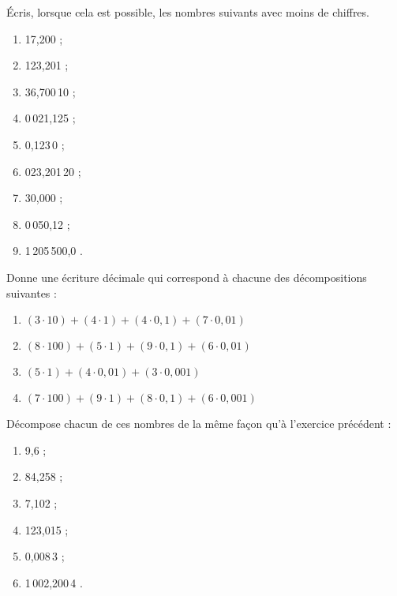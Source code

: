 \begin{exercice}
Écris, lorsque cela est possible, les nombres suivants avec moins de chiffres.
\begin{enumerate} 
 \item 17,200 \dotfill ; 
 
 \item 123,201 \dotfill ; 
  
 \item 36,700\,10 \dotfill ; 
 
 \item 0\,021,125 \dotfill ; 
 
 \item 0,123\,0 \dotfill ; 
 
 \item 023,201\,20 \dotfill ; 
 
 \item 30,000 \dotfill ; 
 
 \item 0\,050,12 \dotfill ; 
 
 \item 1\,205\,500,0 \dotfill. 
  
 \end{enumerate}
\end{exercice}


\vspace{2em}%


\begin{exercice}[Décomposition]
Donne une écriture décimale qui correspond à chacune des décompositions suivantes :
\begin{enumerate}
 \item $(3 \cdot 10) + (4 \cdot 1) + (4 \cdot 0,1) + (7 \cdot 0,01)$
 \item $(8 \cdot 100) + (5 \cdot 1) + (9 \cdot 0,1) + (6 \cdot 0,01)$
 \item $(5 \cdot 1) + (4 \cdot 0,01) + (3 \cdot 0,001)$
 \item $(7 \cdot 100) + (9 \cdot 1) + (8 \cdot 0,1) + (6 \cdot 0,001)$
 \end{enumerate}
\end{exercice}


\begin{exercice}
Décompose chacun de ces nombres de la même façon qu'à l'exercice précédent :
\begin{enumerate} 
 \item 9,6 \dotfill ; 
 
 \item 84,258 \dotfill ; 
 
 \item 7,102 \dotfill ;
 
 \item 123,015 \dotfill ; 
 
 \item 0,008\,3 \dotfill ; 
 
 \item 1\,002,200\,4 \dotfill.
 
 \end{enumerate}
\end{exercice}

